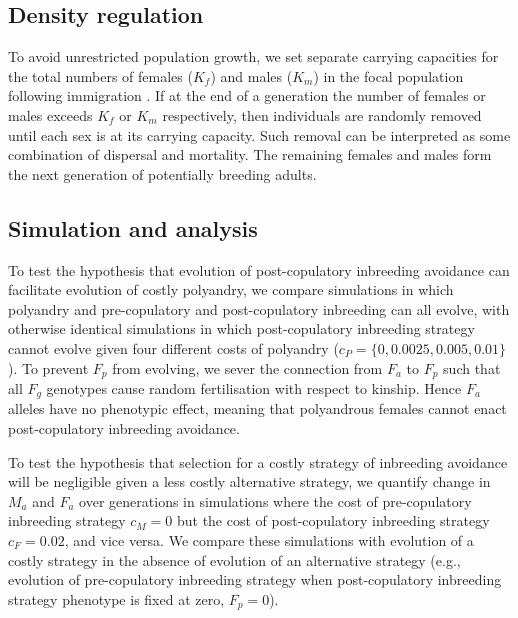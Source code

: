 \documentclass[10pt,letterpaper]{article}
\begin{document}
\subsection*{Density regulation}

To avoid unrestricted population growth, we set separate carrying capacities for the total numbers of females ($K_{f}$) and males ($K_{m}$) in the focal population following immigration \cite[][]{Guillaume2009, Duthie}. If at the end of a generation the number of females or males exceeds $K_{f}$ or $K_{m}$  respectively, then individuals are randomly removed until each sex is at its carrying capacity. Such removal can be interpreted as some combination of dispersal and mortality. The remaining females and males form the next generation of potentially breeding adults.

\subsection*{Simulation and analysis}

To test the hypothesis that evolution of post-copulatory inbreeding avoidance can facilitate evolution of costly polyandry, we compare simulations in which polyandry and pre-copulatory and post-copulatory inbreeding can all evolve, with otherwise identical simulations in which post-copulatory inbreeding strategy cannot evolve given four different costs of polyandry ($c_{P} = \{0, 0.0025, 0.005,  0.01\}$). To prevent $F_{p}$ from evolving, we sever the connection from $F_{a}$ to $F_{p}$ such that all $F_{g}$ genotypes cause random fertilisation with respect to kinship. Hence $F_{a}$ alleles have no phenotypic effect, meaning that polyandrous females cannot enact post-copulatory inbreeding avoidance.

To test the hypothesis that selection for a costly strategy of inbreeding avoidance will be negligible given a less costly alternative strategy, we quantify change in $M_{a}$ and $F_{a}$ over generations in simulations where the cost of pre-copulatory inbreeding strategy $c_{M}=0$ but the cost of post-copulatory inbreeding strategy $c_{F}=0.02$, and vice versa. We compare these simulations with evolution of a costly strategy in the absence of evolution of an alternative strategy (e.g., evolution of pre-copulatory inbreeding strategy when post-copulatory inbreeding strategy phenotype is fixed at zero, $F_{p}=0$).
\end{document}
